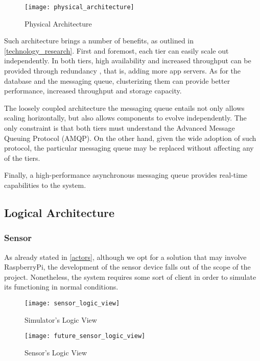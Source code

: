 \begin{figure}[H]
	\centering
	\texttt{[image: physical\_architecture]}
	\caption{Physical Architecture}
	\label{fig:physical_architecture}
\end{figure}

Such architecture brings a number of benefits, as outlined in \ref{technology_research}. First and foremost, each tier can easily scale out independently. In both tiers, high availability and increased throughput can be provided through redundancy \cite{Antwerp}, that is, adding more app servers. As for the database and the messaging queue, clusterizing them can provide better performance, increased throughput and storage capacity.

The loosely coupled architecture the messaging queue entails not only allows scaling horizontally, but also allows components to evolve independently. The only constraint is that both tiers must understand the Advanced Message Queuing Protocol (AMQP). On the other hand, given the wide adoption of such protocol, the particular messaging queue may be replaced without affecting any of the tiers.

Finally, a high-performance asynchronous messaging queue provides real-time capabilities to the system.

\subsection{Logical Architecture}

\subsubsection{Sensor}

As already stated in \ref{actors}, although we opt for a solution that may involve RaspberryPi, the development of the sensor device falls out of the scope of the project. Nonetheless, the system requires some sort of client in order to simulate its functioning in normal conditions.

\begin{figure}[H]
\begin{minipage}{.5\textwidth}
	\centering
	\texttt{[image: sensor\_logic\_view]}
	\caption{Simulator's Logic View}
	\label{fig:sensor_logic_view}
\end{minipage}
\begin{minipage}{.5\textwidth}
	\centering
	\texttt{[image: future\_sensor\_logic\_view]}
	\caption{Sensor's Logic View}
	\label{fig:future_sensor_logic_view}
\end{minipage}
\end{figure}

